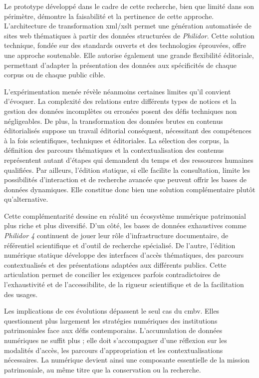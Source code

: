 Le prototype développé dans le cadre de cette recherche, bien que limité dans son périmètre, démontre la faisabilité et la pertinence de cette approche. L'architecture de transformation \gls{xml}/\gls{xslt} permet une génération automatisée de sites web thématiques à partir des données structurées de \textit{Philidor}. Cette solution technique, fondée sur des standards ouverts et des technologies éprouvées, offre une approche soutenable. Elle autorise également une grande flexibilité éditoriale, permettant d'adapter la présentation des données aux spécificités de chaque corpus ou de chaque public cible.

L'expérimentation menée révèle néanmoins certaines limites qu'il convient d'évoquer. La complexité des relations entre différents types de notices et la gestion des données incomplètes ou erronées posent des défis techniques non négligeables. De plus, la transformation des données brutes en contenus éditorialisés suppose un travail éditorial conséquent, nécessitant des compétences à la fois scientifiques, techniques et éditoriales. La sélection des corpus, la définition des parcours thématiques et la contextualisation des contenus représentent autant d'étapes qui demandent du temps et des ressources humaines qualifiées. Par ailleurs, l'édition statique, si elle facilite la consultation, limite les possibilités d'interaction et de recherche avancée que peuvent offrir les bases de données dynamiques. Elle constitue donc bien une solution complémentaire plutôt qu'alternative.

Cette complémentarité dessine en réalité un écosystème numérique patrimonial plus riche et plus diversifié. D'un côté, les bases de données exhaustives comme \textit{Philidor 4} continuent de jouer leur rôle d'infrastructure documentaire, de référentiel scientifique et d'outil de recherche spécialisé. De l'autre, l'édition numérique statique développe des interfaces d'accès thématiques, des parcours contextualisés et des présentations adaptées aux différents publics. Cette articulation permet de concilier les exigences parfois contradictoires de l'exhaustivité et de l'\gls{accessibilite}, de la rigueur scientifique et de la facilitation des usages.

Les implications de ces évolutions dépassent le seul cas du \gls{cmbv}. Elles questionnent plus largement les stratégies numériques des institutions patrimoniales face aux défis contemporains. L'accumulation de données numériques ne suffit plus ; elle doit s'accompagner d'une réflexion sur les modalités d'accès, les parcours d'appropriation et les contextualisations nécessaires. La  numérique devient ainsi une composante essentielle de la mission patrimoniale, au même titre que la conservation ou la recherche.

